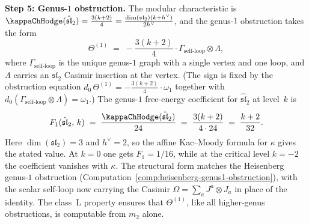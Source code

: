 \begin{computation}
\medskip
\noindent\textbf{Step 5: Genus-$1$ obstruction.}
The modular characteristic is $\kappaChHodge(\hat{\mathfrak{sl}}_2)
= \frac{3(k+2)}{4}
= \frac{\dim(\mathfrak{sl}_2)(k+h^\vee)}{2h^\vee}$, and the genus-$1$ obstruction takes the form
\begin{equation}\label{eq:sl2-genus1}
\Theta^{(1)} \;=\;
-\frac{3(k+2)}{4} \cdot \Gamma_{\text{self-loop}} \otimes \Lambda,
\end{equation}
where $\Gamma_{\text{self-loop}}$ is the unique genus-$1$
graph with a single vertex and one loop, and $\Lambda$
carries an $\mathfrak{sl}_2$ Casimir insertion at the
vertex. (The sign is fixed by the obstruction equation
$d_0\,\Theta^{(1)} = -\frac{3(k+2)}{4}\cdot\omega_1$ together with
$d_0(\Gamma_{\text{self-loop}} \otimes \Lambda) = \omega_1$.)
The genus-$1$ free-energy coefficient for
$\hat{\mathfrak{sl}}_2$ at level~$k$ is
\[
F_1(\hat{\mathfrak{sl}}_2,\, k)
\;=\;
\frac{\kappaChHodge(\hat{\mathfrak{sl}}_2)}{24}
\;=\;
\frac{3(k+2)}{4\cdot 24}
\;=\;
\frac{k+2}{32}.
\]
Here $\dim(\mathfrak{sl}_2)=3$ and $h^\vee=2$, so the affine
Kac--Moody formula for $\kappa$ gives the stated value. At
$k=0$ one gets $F_1 = 1/16$, while at the critical level
$k=-2$ the coefficient vanishes with $\kappa$. The structural form matches the
Heisenberg genus-$1$ obstruction
(Computation~\ref{comp:heisenberg-genus1-obstruction}),
with the scalar self-loop now carrying the Casimir
$\Omega = \sum_a J^a \otimes J_a$ in place of the identity.
The class~L property ensures that
$\Theta^{(1)}$, like all higher-genus
obstructions, is computable from $m_2$ alone.
\end{computation}

